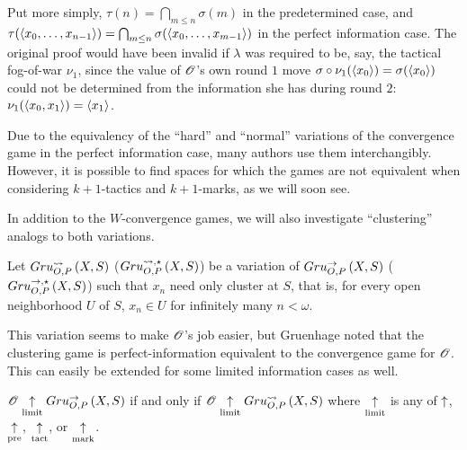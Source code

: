 Put more simply, $\tau(n)=\bigcap_{m\leq n}\sigma(m)$ in the predetermined
case, and
$\tau(\langle x_0,\dots,x_{n-1}\rangle)=\bigcap_{m\leq n}\sigma(\langle x_0,\dots,x_{m-1}\rangle)$
in the perfect information case.
The original proof would have been invalid if $\lambda$ was required to be, say,
the tactical fog-of-war $\nu_1$, since the value of $\mathscr{O}$'s own round $1$ move
$\sigma\circ\nu_1(\langle x_0\rangle)=\sigma(\langle x_0\rangle)$
could not be determined from the information she has during round
$2$: $\nu_1(\langle x_0,x_1\rangle)=\langle x_1\rangle$.

Due to the equivalency of the ``hard'' and ``normal'' variations of the
convergence game in the perfect information case, many authors use them
interchangibly. However, it is possible to find spaces for which the games are
not equivalent when considering $k+1$-tactics and $k+1$-marks, as we will
soon see.

In addition to the $W$-convergence games, we will also investigate
``clustering'' analogs to both variations.

\begin{game}
  Let $Gru_{O,P}^{\leadsto}\left({X},{S}\right)$ ($Gru_{O,P}^{\leadsto,\star}\left({X},{S}\right)$) be a variation of
  $Gru_{O,P}^{\to}\left({X},{S}\right)$ ($Gru_{O,P}^{\to,\star}\left({X},{S}\right)$) such that $x_n$ need only
  cluster at $S$, that is, for every open neighborhood $U$ of $S$, $x_n\in U$
  for infinitely many $n<\omega$.
\end{game}

This variation seems to make $\mathscr{O}$'s job easier, but Gruenhage noted that
the clustering game is perfect-information equivalent to the convergence game
for $\mathscr{O}$. This can easily be extended for some limited information cases
as well.

\begin{prop}
  $\mathscr{O} \underset{\text{limit}}{\uparrow} Gru_{O,P}^{\to}\left({X},{S}\right)$
    if and only if
  $\mathscr{O} \underset{\text{limit}}{\uparrow} Gru_{O,P}^{\leadsto}\left({X},{S}\right)$
  where $\underset{\text{limit}}{\uparrow}$ is any of $\uparrow$, $\underset{\text{pre}}{\uparrow}$, $\underset{\text{tact}}{\uparrow}$, or $\underset{\text{mark}}{\uparrow}$.
\end{prop}


